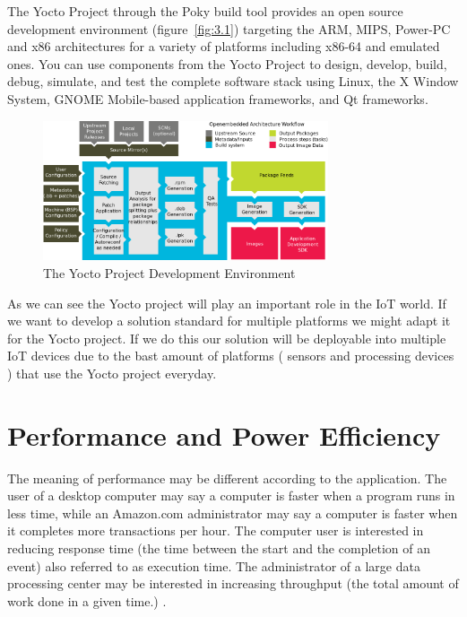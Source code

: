 The Yocto Project through the Poky build tool provides an open source
development environment (figure~\ref{fig:3.1})  targeting the ARM, MIPS,
Power-PC and x86 architectures for a variety of platforms including x86-64 and
emulated ones.  You can use components from the Yocto Project to design,
develop, build, debug, simulate, and test the complete software stack using
Linux, the X Window System, GNOME Mobile-based application frameworks, and Qt
frameworks. 

\begin{figure}[H]
\centering
\includegraphics[width=0.75\textwidth]{images/yocto-environment.png}
\caption{The Yocto Project Development Environment}
\label{fig:3.2}
\end{figure}

As we can see the Yocto project will play an important role in the IoT world.
If we want to develop a solution standard for multiple platforms we might adapt
it for the Yocto project. If we do this our solution will be deployable into
multiple IoT devices due to the bast amount of platforms ( sensors and
processing devices ) that use the Yocto project everyday.

\section{Performance and Power Efficiency}

\noindent

The meaning of performance may be different according to the application.
The user of a desktop computer may say a computer is faster when a program runs in less
time, while an Amazon.com administrator may say a computer is faster when it
completes more transactions per hour. The computer user is interested in 
reducing response time (the time between the start and the completion of an 
event) \cite{Hennessy} also referred to as execution time. The administrator of a large data 
processing center may be interested in increasing throughput (the total amount 
of work done in a given time.) \cite{Hennessy}. 

